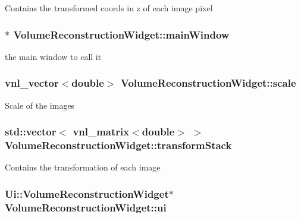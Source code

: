 Contains the transformed coords in z of each image pixel \hypertarget{class_volume_reconstruction_widget_a3c4a62c79152059201b1ace97af89691}{
\subsubsection[{main\-Window}]{$\ast$ {\bf Volume\-Reconstruction\-Widget\-::main\-Window}}}\label{d5/d55/class_volume_reconstruction_widget_a3c4a62c79152059201b1ace97af89691}
the main window to call it \hypertarget{class_volume_reconstruction_widget_ae236e766bdd26a8e1d3af5abc965b558}{
\subsubsection[{scale}]{\setlength{\rightskip}{0pt plus 5cm}vnl\-\_\-vector$<$double$>$ {\bf Volume\-Reconstruction\-Widget\-::scale}}}\label{d5/d55/class_volume_reconstruction_widget_ae236e766bdd26a8e1d3af5abc965b558}
Scale of the images \hypertarget{class_volume_reconstruction_widget_a184f596737a8ba01e74e2acb3843fcfc}{
\subsubsection[{transform\-Stack}]{\setlength{\rightskip}{0pt plus 5cm}std\-::vector$<$ vnl\-\_\-matrix$<$double$>$ $>$ {\bf Volume\-Reconstruction\-Widget\-::transform\-Stack}}}\label{d5/d55/class_volume_reconstruction_widget_a184f596737a8ba01e74e2acb3843fcfc}
Contains the transformation of each image \hypertarget{class_volume_reconstruction_widget_afe330d72d1167607d761a6be7f5c4048}{
\subsubsection[{ui}]{\setlength{\rightskip}{0pt plus 5cm}Ui\-::\-Volume\-Reconstruction\-Widget$\ast$ {\bf Volume\-Reconstruction\-Widget\-::ui}}}\label{d5/d55/class_volume_reconstruction_widget_afe330d72d1167607d761a6be7f5c4048}
